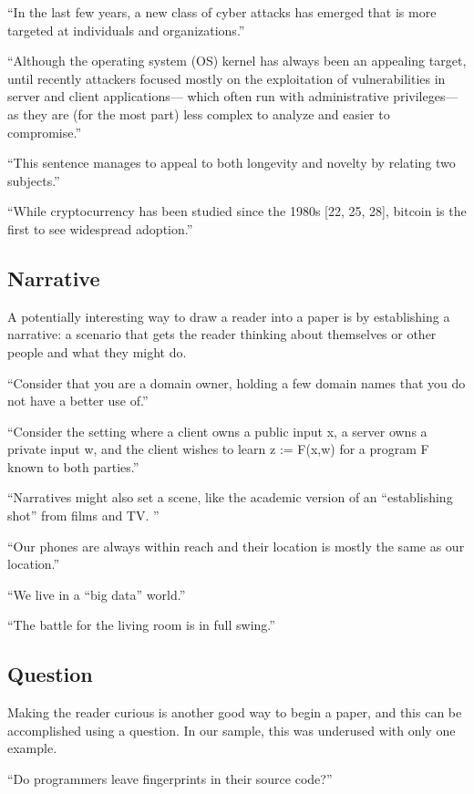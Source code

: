 \documentclass[sigconf]{acmart}
\begin{document}
	``In the last few years, a new class of cyber attacks has emerged that is more targeted at individuals and organizations.''
	
	``Although the operating system (OS) kernel has always been an appealing target, until recently attackers focused mostly on the exploitation of vulnerabilities in server and client applications— which often run with administrative privileges—as they are (for the most part) less complex to analyze and easier to compromise.''
	
	``This sentence manages to appeal to both longevity and novelty by relating two subjects.''
	
	``While cryptocurrency has been studied since the 1980s [22, 25, 28], bitcoin is the first to see widespread adoption.''
	
	\subsection{Narrative}
	
	A potentially interesting way to draw a reader into a paper is by establishing a narrative: a scenario that gets the reader thinking about themselves or other people and what they might do.  
	
	``Consider that you are a domain owner, holding a few domain names that you do not have a better use of.''
	
	``Consider the setting where a client owns a public input x, a server owns a private input w, and the client wishes to learn z := F(x,w) for a program F known to both parties.''
	
	``Narratives might also set a scene, like the academic version of an “establishing shot” from films and TV. ''
	
	``Our phones are always within reach and their location is mostly the same as our location.''
	
	``We live in a “big data” world.''
	
	``The battle for the living room is in full swing.''
	
	\subsection{Question} 
	
	Making the reader curious is another good way to begin a paper, and this can be accomplished using a question. In our sample, this was underused with only one example.
	
	``Do programmers leave fingerprints in their source code?''
	
\end{document}
